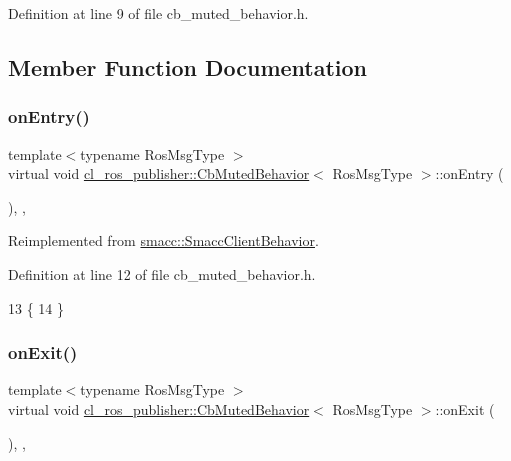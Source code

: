 Definition at line 9 of file cb\+\_\+muted\+\_\+behavior.\+h.



\subsection{Member Function Documentation}
\mbox{\label{classcl__ros__publisher_1_1CbMutedBehavior_a79376d9160e3bd44678a2c0d89f1b4de}} 
\subsubsection{\texorpdfstring{on\+Entry()}{onEntry()}}
{\footnotesize\ttfamily template$<$typename Ros\+Msg\+Type $>$ \\
virtual void \hyperlink{classcl__ros__publisher_1_1CbMutedBehavior}{cl\+\_\+ros\+\_\+publisher\+::\+Cb\+Muted\+Behavior}$<$ Ros\+Msg\+Type $>$\+::on\+Entry (\begin{DoxyParamCaption}{ }\end{DoxyParamCaption})\hspace{0.3cm}{\ttfamily [inline]}, {\ttfamily [override]}, {\ttfamily [virtual]}}



Reimplemented from \hyperlink{classsmacc_1_1SmaccClientBehavior_ad5d3e1f1697c3cfe66c94cadba948493}{smacc\+::\+Smacc\+Client\+Behavior}.



Definition at line 12 of file cb\+\_\+muted\+\_\+behavior.\+h.


\begin{DoxyCode}
13     \{
14     \}
\end{DoxyCode}
\mbox{\label{classcl__ros__publisher_1_1CbMutedBehavior_a4c02187c58358fa811777d9956510222}} 
\subsubsection{\texorpdfstring{on\+Exit()}{onExit()}}
{\footnotesize\ttfamily template$<$typename Ros\+Msg\+Type $>$ \\
virtual void \hyperlink{classcl__ros__publisher_1_1CbMutedBehavior}{cl\+\_\+ros\+\_\+publisher\+::\+Cb\+Muted\+Behavior}$<$ Ros\+Msg\+Type $>$\+::on\+Exit (\begin{DoxyParamCaption}{ }\end{DoxyParamCaption})\hspace{0.3cm}{\ttfamily [inline]}, {\ttfamily [override]}, {\ttfamily [virtual]}}



